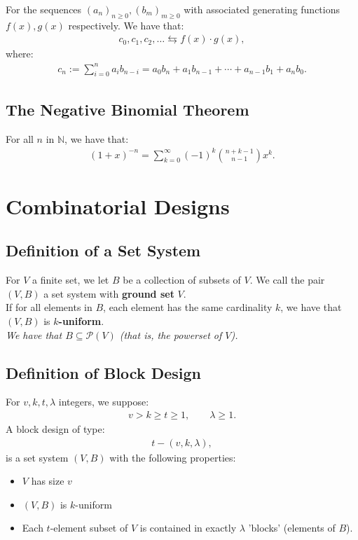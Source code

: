 \documentclass[a4paper, 12pt, twoside]{article}
\begin{document}
For the sequences $(a_n)_{n \geq 0}, (b_m)_{m \geq 0}$ with 
associated generating functions $f(x), g(x)$ respectively.
We have that: \begin{gather*}
  c_0, c_1, c_2, \ldots \leftrightarrows f(x) \cdot g(x),
\end{gather*} where: \begin{gather*}
  c_n := \sum_{i = 0}^{n} a_ib_{n - i} = a_0b_n + a_1b_{n-1} 
  + \cdots + a_{n-1}b_1 + a_nb_0.
\end{gather*}

\subsection{The Negative Binomial Theorem}

For all $n$ in $\mathbb{N}$, we have that: \begin{gather*}
  (1 + x)^{-n} = \sum_{k = 0}^\infty (-1)^k{n + k - 1 \choose n - 1}x^k.
\end{gather*}

\vfill

\section{Combinatorial Designs}

\subsection{Definition of a Set System}

For $V$ a finite set, we let $B$ be a collection of subsets of $V$.
We call the pair $(V, B)$ a set system with \textbf{ground set} $V$.
\\[\baselineskip]
If for all elements in $B$, each element has the same cardinality $k$,
we have that $(V, B)$ is \textbf{$k$-uniform}.  
\\[\baselineskip]
\textit{We have that $B \subseteq \mathcal{P}(V)$ (that is, the 
powerset of $V$).}
 
\subsection{Definition of Block Design} For $v, k, t, \lambda$ integers,
we suppose: \begin{gather*}
  v > k \geq t \geq 1, \qquad \lambda \geq 1.
\end{gather*} A block design of type: \begin{gather*}
  t-(v, k, \lambda),
\end{gather*} is a set system $(V, B)$ with the following properties:
\begin{itemize}
  \item $V$ has size $v$
  \item $(V, B)$ is $k$-uniform
  \item Each $t$-element subset of $V$ is contained in exactly
  $\lambda$ 'blocks' (elements of $B$).
\end{itemize}
\end{document}
